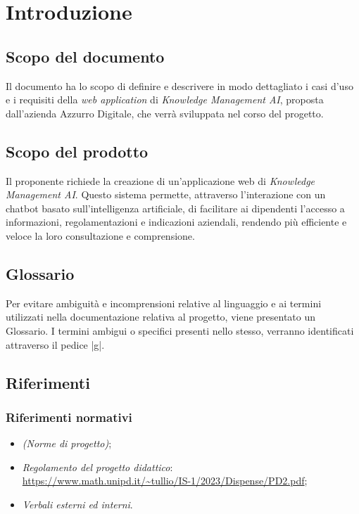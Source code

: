 \documentclass[10pt, a4paper]{article}
\title{\titolo}
\author{SWEetCode}
\begin{document}



\newpage

\tableofcontents
\newpage

\listoffigures
\newpage

\listoftables
\newpage

\section{Introduzione}
\subsection{Scopo del documento}
Il documento ha lo scopo di definire e descrivere in modo dettagliato i casi d'uso e i requisiti della \textit{web application} di \textit{Knowledge Management AI}, proposta dall'azienda Azzurro Digitale, che verrà sviluppata nel corso del progetto.
\subsection{Scopo del prodotto}
Il proponente richiede la creazione di un'applicazione web di \textit{Knowledge Management AI}. Questo sistema permette, attraverso l'interazione con un chatbot basato sull'intelligenza artificiale, di facilitare ai dipendenti l'accesso a informazioni, regolamentazioni e indicazioni aziendali, rendendo più efficiente e veloce la loro consultazione e comprensione.
\subsection{Glossario}
Per evitare ambiguità e incomprensioni relative al linguaggio e ai termini utilizzati nella documentazione relativa al progetto, viene presentato un Glossario. I termini ambigui o specifici presenti nello stesso, verranno identificati attraverso il pedice |g|.

\subsection{Riferimenti}
   \subsubsection{Riferimenti normativi}
   \begin{itemize}
    \item \textit{(Norme di progetto)};
    \item \textit{Regolamento del progetto didattico}: \\
    \href{https://www.math.unipd.it/~tullio/IS-1/2023/Dispense/PD2.pdf}{https://www.math.unipd.it/\textasciitilde tullio/IS-1/2023/Dispense/PD2.pdf};
    \item \textit{Verbali esterni ed interni}.
    \end{itemize}
    
\end{document}
